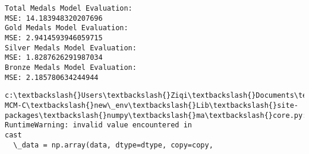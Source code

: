 \documentclass[11pt]{article}
\begin{document}
    \begin{Verbatim}[commandchars=\\\{\}]
Total Medals Model Evaluation:
MSE: 14.183948320207696
Gold Medals Model Evaluation:
MSE: 2.9414593946059715
Silver Medals Model Evaluation:
MSE: 1.8287626291987034
Bronze Medals Model Evaluation:
MSE: 2.185780634244944
    \end{Verbatim}

    \begin{Verbatim}[commandchars=\\\{\}]
c:\textbackslash{}Users\textbackslash{}Ziqi\textbackslash{}Documents\textbackslash{}Python\textbackslash{}2025-MCM-C\textbackslash{}new\_env\textbackslash{}Lib\textbackslash{}site-
packages\textbackslash{}numpy\textbackslash{}ma\textbackslash{}core.py:2892: RuntimeWarning: invalid value encountered in
cast
  \_data = np.array(data, dtype=dtype, copy=copy,
    \end{Verbatim}
\end{document}
